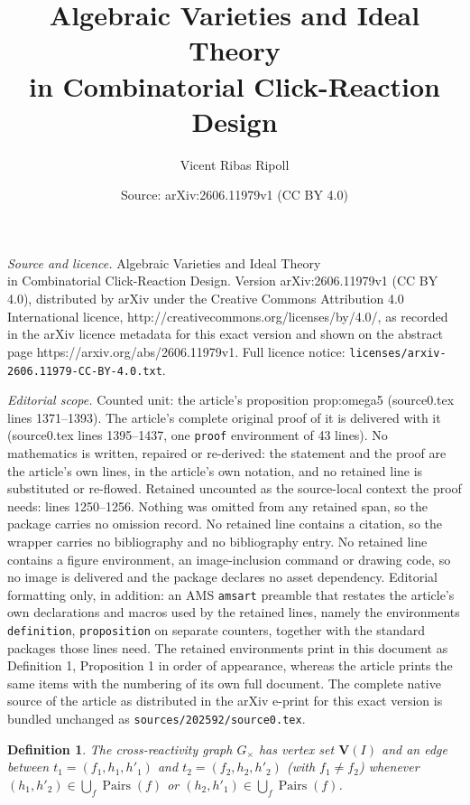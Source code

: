 \documentclass[10pt,a4paper]{amsart}
\title{Algebraic Varieties and Ideal Theory\\ in Combinatorial Click-Reaction Design}
\author{Vicent Ribas Ripoll}
\date{Source: arXiv:2606.11979v1 (CC BY 4.0)}
\newtheorem{definition}{Definition}
\DeclareMathOperator{\Pairs}{Pairs}
\newcommand{\Var}{\mathbf{V}}
\begin{document}
\maketitle

\noindent\emph{Source and licence.} Algebraic Varieties and Ideal Theory\\ in Combinatorial Click-Reaction Design. Version arXiv:2606.11979v1 (CC BY 4.0), distributed by arXiv under the Creative Commons Attribution 4.0 International licence, http://creativecommons.org/licenses/by/4.0/, as recorded in the arXiv licence metadata for this exact version and shown on the abstract page https://arxiv.org/abs/2606.11979v1. Full licence notice: \texttt{licenses/arxiv-2606.11979-CC-BY-4.0.txt}.\par\smallskip

\noindent\textit{Editorial scope.} Counted unit: the article's proposition prop:omega5 (source0.tex lines 1371--1393). The article's complete original proof of it is delivered with it (source0.tex lines 1395--1437, one \texttt{proof} environment of 43 lines). No mathematics is written, repaired or re-derived: the statement and the proof are the article's own lines, in the article's own notation, and no retained line is substituted or re-flowed.  Retained uncounted as the source-local context the proof needs: lines 1250--1256.  Nothing was omitted from any retained span, so the package carries no omission record.  No retained line contains a citation, so the wrapper carries no bibliography and no bibliography entry.  No retained line contains a figure environment, an image-inclusion command or drawing code, so no image is delivered and the package declares no asset dependency.  Editorial formatting only, in addition: an AMS \texttt{amsart} preamble that restates the article's own declarations and macros used by the retained lines, namely the environments \texttt{definition}, \texttt{proposition} on separate counters, together with the standard packages those lines need.  The retained environments print in this document as Definition 1, Proposition 1 in order of appearance, whereas the article prints the same items with the numbering of its own full document.  The complete native source of the article as distributed in the arXiv e-print for this exact version is bundled unchanged as \texttt{sources/202592/source0.tex}.
\begin{definition}\label{def:cross-graph}
The \emph{cross-reactivity graph} $G_\times$ has vertex set
$\Var(I)$ and an edge between $t_1 = (f_1, h_1, h'_1)$ and
$t_2 = (f_2, h_2, h'_2)$ (with $f_1 \neq f_2$) whenever
$(h_1, h'_2) \in \bigcup_f \Pairs(f)$ or
$(h_2, h'_1) \in \bigcup_f \Pairs(f)$.
\end{definition}
\end{document}
